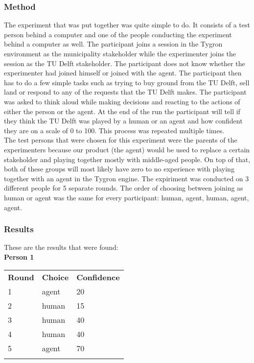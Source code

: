 \documentclass[11pt,a4paper]{article}
\begin{document}
\subsubsection{Method}
The experiment that was put together was quite simple to do. It consists of a test person behind a computer and one of the people conducting the experiment behind a computer as well. The participant joins a session in the Tygron environment as the municipality stakeholder while the experimenter joins the session as the TU Delft stakeholder. The participant does not know whether the experimenter had joined himself or joined with the agent. The participant then has to do a few simple tasks such as trying to buy ground from the TU Delft, sell land or respond to any of the requests that the TU Delft makes. The participant was asked to think aloud while making decisions and reacting to the actions of either the person or the agent. At the end of the run the participant will tell if they think the TU Delft was played by a human or an agent and how confident they are on a scale of 0 to 100. This process was repeated multiple times. \\

The test persons that were chosen for this experiment were the parents of the experimenters because our product (the agent) would be used to replace a certain stakeholder and playing together mostly with middle-aged people. On top of that, both of these groups will most likely have zero to no experience with playing together with an agent in the Tygron engine. The expiriment was conducted on 3 different people for 5 separate rounds. The order of choosing between joining as human or agent was the same for every participant: human, agent, human, agent, agent.

\subsubsection{Results}
These are the results that were found: \\

\textbf{Person 1}
\begin{tabular}{lll}
\textbf{Round} & \textbf{Choice}  & \textbf{Confidence}\\ 
1 & agent  & 20         \\
2 & human  & 15         \\
3 & human  & 40         \\
4 & human  & 40         \\
5 & agent  & 70        \\\\
\end{tabular}
\end{document}
